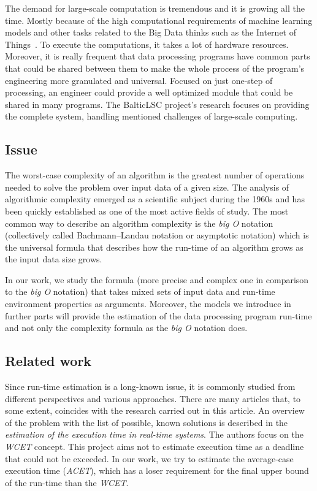 The demand for large-scale computation is tremendous and it is growing all the time. Mostly because of the high computational requirements of machine learning models and other tasks related to the Big Data thinks such as the Internet of Things~\cite{iot}. To execute the computations, it takes a lot of hardware resources. Moreover, it is really frequent that data processing programs have common parts that could be shared between them to make the whole process of the program's engineering more granulated and universal. Focused on just one-step of processing, an engineer could provide a well optimized module that could be shared in many programs. The BalticLSC project's research focuses on providing the complete system, handling mentioned challenges of large-scale computing.

\subsection{Issue}

The worst-case complexity of an algorithm is the greatest number of operations needed to solve the problem over input data of a given size. The analysis of algorithmic complexity emerged as a scientific subject during the 1960s and has been quickly established as one of the most active fields of study\cite{complexity}. The most common way to describe an algorithm complexity is the \textit{big O} notation (collectively called Bachmann–Landau notation or asymptotic notation) which is the universal formula that describes how the run-time of an algorithm grows as the input data size grows. 

In our work, we study the formula (more precise and complex one in comparison to the \textit{big O} notation) that takes mixed sets of input data and run-time environment properties as arguments. Moreover, the models we introduce in further parts will provide the estimation of the data processing program run-time and not only the complexity formula as the \textit{big O} notation does.

\subsection{Related work}

Since run-time estimation is a long-known issue, it is commonly studied from different perspectives and various approaches. There are many articles that, to some extent, coincides with the research carried out in this article. An overview of the problem with the list of possible, known solutions is described in the \textit{estimation of the execution time in real-time systems}\cite{wcet}. The authors focus on the \textit{WCET} concept. This project aims not to estimate execution time as a deadline that could not be exceeded. In our work, we try to estimate the average-case execution time (\textit{ACET}), which has a loser requirement for the final upper bound of the run-time than the \textit{WCET}.

